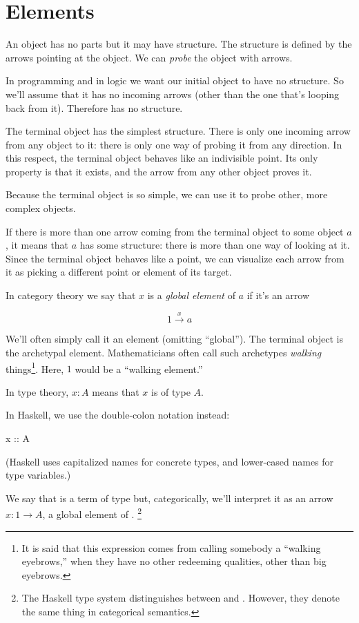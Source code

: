 \documentclass[DaoFP]{subfiles}
\begin{document}
\section{Elements}

An object has no parts but it may have structure. The structure is defined by the arrows pointing at the object. We can \emph{probe} the object with arrows.

In programming and in logic we want our initial object to have no structure. So we'll assume that it has no incoming arrows (other than the one that's looping back from it). Therefore  has no structure. 

The terminal object has the simplest structure. There is only one incoming arrow from any object to it: there is only one way of probing it from any direction. In this respect, the terminal object behaves like an indivisible point. Its only property is that it exists, and the arrow from any other object proves it. 

Because the terminal object is so simple, we can use it to probe other, more complex objects. 

If there is more than one arrow coming from the terminal object to some object $a$, it means that $a$ has some structure: there is more than one way of looking at it. Since the terminal object behaves like a point, we can visualize each arrow from it as picking a different point or element of its target. 

In category theory we say that $ x$ is a \emph{global element} of $a$ if it's an arrow

\[ 1 \xrightarrow x a \]

We'll often simply call it an element (omitting ``global''). The terminal object is the archetypal element. Mathematicians often call such archetypes \emph{walking} things\footnote{It is said that this expression comes from calling somebody a ``walking eyebrows,'' when they have no other redeeming qualities, other than big eyebrows.}. Here, $1$ would be a ``walking element.'' 

In type theory, $ x \colon A$ means that $x$ is of type $A$.

In Haskell, we use the double-colon notation instead:
\begin{haskell}
x :: A
\end{haskell}
(Haskell uses capitalized names for concrete types, and lower-cased names for type variables.)

We say that  is a term of type  but, categorically, we'll interpret it as an arrow $x : 1 \to A$, a global element of . \footnote{The Haskell type system distinguishes between  and . However, they denote the same thing in categorical semantics.}
\end{document}
